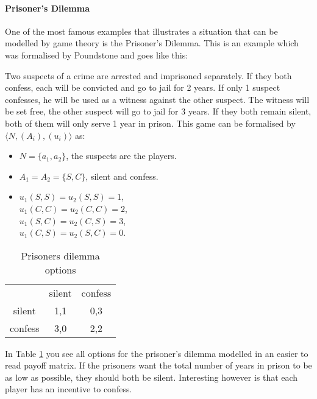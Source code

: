\paragraph{Prisoner's Dilemma}
One of the most famous examples that illustrates a situation that can be modelled by game theory is the Prisoner's Dilemma. This is an example which was formalised by Poundstone \cite{poundstone} and goes like this: 

Two suspects of a crime are arrested and imprisoned separately. If they both confess, each will be convicted and go to jail for 2 years. If only 1 suspect confesses, he will be used as a witness against the other suspect. The witness will be set free, the other suspect will go to jail for 3 years. If they both remain silent, both of them will only serve 1 year in prison. This game can be formalised by $\langle N, (A_i), (u_i) \rangle$ as:
\begin{itemize}
	\item $N = \{a_{1}, a_{2} \}$, the suspects are the players.
    \item $A_1 = A_2 = \{S, C\}$, silent and confess.
    \item $u_1(S, S) = u_2(S, S) = 1$, \\
    $u_1(C, C) = u_2(C, C) = 2$, \\
    $u_1(S, C) = u_2(C, S) = 3$, \\
    $u_1(C, S) = u_2(S, C) = 0$.

\end{itemize}

\begin{table}[h]
\centering
\begin{tabular}{ccc}
                             & silent                   & confess                   \\ \cline{2-3} 
\multicolumn{1}{c|}{silent}  & \multicolumn{1}{c|}{1,1} & \multicolumn{1}{c|}{0,3} \\ \cline{2-3} 
\multicolumn{1}{c|}{confess} & \multicolumn{1}{c|}{3,0} & \multicolumn{1}{c|}{2,2} \\ \cline{2-3} 
\end{tabular}
\caption{Prisoners dilemma options}
\label{prisoners-d}
\end{table}

In Table \ref{prisoners-d} you see all options for the prisoner's dilemma modelled in an easier to read payoff matrix. 
If the prisoners want the total number of years in prison to be as low as possible, they should both be silent. Interesting however is that each player has an incentive to confess. 

